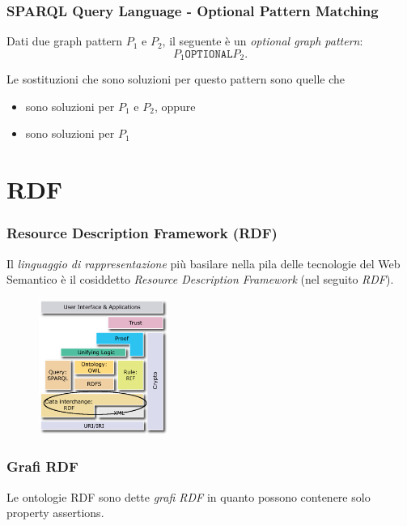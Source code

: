 \documentclass[8pt]{beamer}
\begin{document}
\begin{frame}[fragile]
 \frametitle{SPARQL Query Language - Optional Pattern Matching}

 Dati due graph pattern $P_1$ e $P_2$, il seguente \`e un \emph{optional graph pattern}:
\[
 P_1 \mathtt{OPTIONAL} P_2 .
\]

 Le sostituzioni che sono soluzioni per questo pattern sono quelle che
\begin{itemize}
 \item sono soluzioni per $P_1$ e $P_2$, oppure
 \item sono soluzioni per $P_1$
\end{itemize}
\end{frame}

\section{RDF}
\begin{frame}
 \frametitle{Resource Description Framework (RDF)}
 Il \emph{linguaggio di rappresentazione} pi\`u basilare nella pila
 delle tecnologie del Web Semantico \`e il cosiddetto 
 \emph{Resource Description Framework} (nel seguito \emph{RDF}).
 
  \begin{figure}
  \includegraphics[width=160px]{Semantic_Web_Stack_RDF.png}
 \end{figure}
\end{frame}

\newcommand{\RDFv}{\mathtt{RDF}}

\begin{frame}
 \frametitle{Grafi RDF}
 Le ontologie RDF sono dette \emph{grafi RDF} in quanto possono contenere solo
 property assertions.
 \vspace{\baselineskip}
 

\end{frame}
\end{document}
